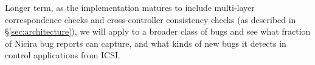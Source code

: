         Longer term, as the \projectname{} implementation matures to include multi-layer correspondence checks and cross-controller consistency checks (as described in \S\ref{sec:architecture}), we will apply \projectname{} to a broader class of bugs and see what fraction of Nicira bug reports \projectname{} can capture, and what kinds of new bugs it detects in control applications from ICSI. 


